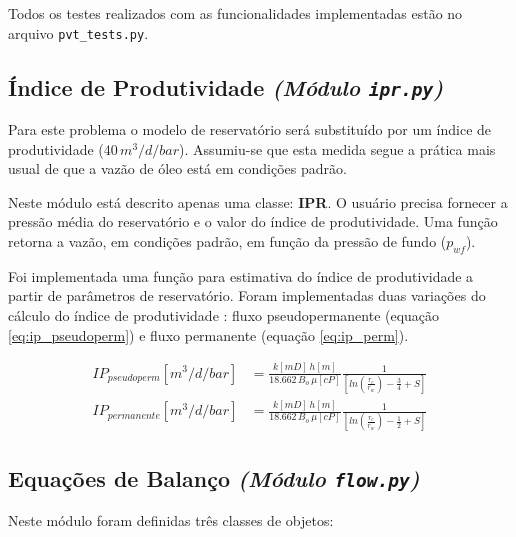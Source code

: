 \documentclass[final,3p]{elsarticle}
\numberwithin{equation}{section}
\begin{document}
        Todos os testes realizados com as funcionalidades implementadas estão no arquivo \texttt{pvt\_tests.py}.

    \subsection{Índice de Produtividade \emph{(Módulo \texttt{ipr.py})}}

        Para este problema o modelo de reservatório será substituído por um índice de produtividade ($40\,m^3/d/bar$). Assumiu-se que esta medida segue a prática mais usual de que a vazão de óleo está em condições padrão.

        Neste módulo está descrito apenas uma classe: \textbf{IPR}. O usuário precisa fornecer a pressão média do reservatório e o valor do índice de produtividade. Uma função retorna a vazão, em condições padrão, em função da pressão de fundo ($p_{wf}$).

        Foi implementada uma função para estimativa do índice de produtividade a partir de parâmetros de reservatório. Foram implementadas duas variações do cálculo do índice de produtividade \cite{rosa2006engenharia}: fluxo pseudopermanente (equação \ref{eq:ip_pseudoperm}) e fluxo permanente (equação \ref{eq:ip_perm}).

        \begin{align}
          IP_{pseudoperm} [m^3/d/bar] &= \frac{k[mD] \, h[m]}{18.662 \, B_o \, \mu[cP]} \frac{1}{\left[ ln(\frac{r_e}{r_w}) - \frac{3}{4} + S \right] } \label{eq:ip_pseudoperm} \\
          IP_{permanente} [m^3/d/bar] &= \frac{k[mD] \, h[m]}{18.662 \, B_o \, \mu[cP]} \frac{1}{\left[ ln(\frac{r_e}{r_w}) - \frac{1}{2} + S \right] } \label{eq:ip_perm}
        \end{align}

        \subsection{Equações de Balanço \emph{(Módulo \texttt{flow.py})}}

        Neste módulo foram definidas três classes de objetos:
\end{document}
